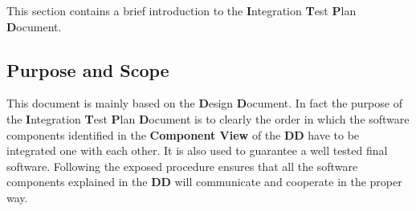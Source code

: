 This section contains a brief introduction to the \textbf{I}ntegration \textbf{T}est \textbf{P}lan \textbf{D}ocument.

\subsection{Purpose and Scope}
This document is mainly based on the \textbf{D}esign \textbf{D}ocument. In fact the purpose of the \textbf{I}ntegration \textbf{T}est \textbf{P}lan \textbf{D}ocument is to clearly the order in which the software components identified in the \textbf{Component View} of the \textbf{DD} have to be integrated one with each other. It is also used to guarantee a well tested final software. Following the exposed procedure ensures that all the software components explained in the \textbf{DD} will communicate and cooperate in the proper way.
